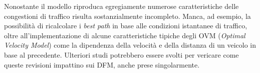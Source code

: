 \documentclass[../main.tex]{subfiles}
\begin{document}
Nonostante il modello riproduca egregiamente numerose caratteristiche delle congestioni di traffico risulta sostanzialmente incompleto.
Manca, ad esempio, la possibilit\`a di ricalcolare i \emph{best path} in base alle condizioni istantanee di traffico, oltre all'implementazione di alcune caratteristiche tipiche degli OVM (\emph{Optimal Velocity Model}) come la dipendenza della velocit\`a e della distanza di un veicolo in base al precedente.
Ulteriori studi potrebbero essere svolti per vericare come queste revisioni impattino sui DFM, anche prese singolarmente.





\end{document}
